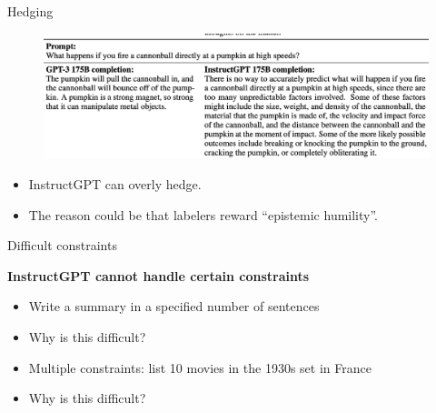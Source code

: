\begin{vbframe}{Hedging}

\vfill

\begin{figure}
\centering
\includegraphics[width = 12cm]{figure/hedging.png}
\end{figure}

\begin{itemize}
	\item InstructGPT can overly hedge.
\item The reason could be that labelers reward ``epistemic humility''.
\end{itemize}

\vfill

\end{vbframe}

\begin{vbframe}{Difficult constraints}

\vfill

\textbf{InstructGPT cannot handle certain constraints}

	\begin{itemize}
		\item Write a summary in a specified number
		of sentences
                \item \ques Why is this difficult?
                \item Multiple constraints: list 10 movies
		in the 1930s set in France
                \item \ques Why is this difficult?
	\end{itemize}

\vfill

\end{vbframe}

